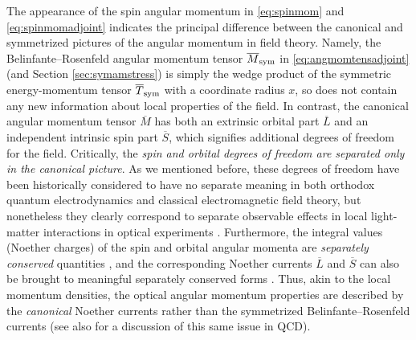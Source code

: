 \documentclass[1p,sort&compress]{elsarticle}
\numberwithin{equation}{section}
\begin{document}
The appearance of the spin angular momentum in \eqref{eq:spinmom} and \eqref{eq:spinmomadjoint} indicates the principal difference between the canonical and symmetrized pictures of the angular momentum in field theory. Namely, the Belinfante--Rosenfeld angular momentum tensor $\overline{M}_{\rm sym}$ in \eqref{eq:angmomtensadjoint} (and Section \ref{sec:symamstress}) is simply the wedge product of the symmetric energy-momentum tensor $\overline{T}_{\rm sym}$ with a coordinate radius $x$, so does not contain any new information about local properties of the field. In contrast, the canonical angular momentum tensor $\overline{M}$ has both an extrinsic orbital part $\overline{L}$ and an independent intrinsic spin part $\overline{S}$, which signifies additional degrees of freedom for the field. Critically, the \emph{spin and orbital degrees of freedom are separated only in the canonical picture}. As we mentioned before, these degrees of freedom have been historically considered to have no separate meaning in both orthodox quantum electrodynamics and classical electromagnetic field theory, but nonetheless they clearly correspond to separate observable effects in local light-matter interactions in optical experiments \cite{Allen1999,Andrews2008,Torres2011,Andrews2013,O'Neil2002,Garces2003,Curtis2003, Zhao2007,Adachi2007}. Furthermore, the integral values  (Noether charges) of the spin and orbital angular momenta are \emph{separately conserved} quantities \cite{Enk1994}, and the corresponding Noether currents $\overline{L}$ and $\overline{S}$ can also be brought to meaningful separately conserved forms \cite{Bliokh2014}.
Thus, akin to the local momentum densities, the optical angular momentum properties are described by the \emph{canonical} Noether currents rather than the symmetrized Belinfante--Rosenfeld currents \cite{Bliokh2013,Bliokh2013a,Bliokh2013b,Bliokh2014} (see also \cite{Leader2014} for a discussion of this same issue in QCD).
\end{document}
